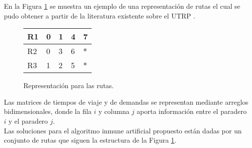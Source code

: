 En la Figura \ref{fig:repr1} se muestra un ejemplo de una representación de rutas el cual se pudo obtener a partir de la literatura existente sobre el UTRP \cite{metaheuristic2010}.

\begin{figure}[!htb]
\begin{center}
\begin{tabular}{|p{0.8cm}|p{0.8cm}|p{0.8cm}|p{0.8cm}|p{0.8cm}|}
\hline
R1 & 0 & 1 & 4 & 7\\
\hline
R2 & 0 & 3 & 6 & $*$\\
\hline
R3 & 1 & 2 & 5 & $*$\\
\hline
\end{tabular}
\caption{Representación para las rutas.}
\label{fig:repr1}
\end{center}
\end{figure}

Las matrices de tiempos de viaje y de demandas se representan mediante arreglos bidimensionales, donde la fila $i$ y columna $j$ aporta información entre el paradero $i$ y el paradero $j$.\\

Las soluciones para el algoritmo inmune artificial propuesto están dadas por un conjunto de rutas que siguen la estructura de la Figura \ref{fig:repr1}.
